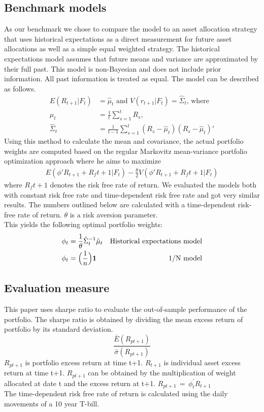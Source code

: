 \subsection{Benchmark models}
As our benchmark we chose to compare the model to an asset allocation strategy that uses historical expectations as a direct measurement for future asset allocations as well as a simple equal weighted strategy. The historical expectations model assumes that future means and variance are approximated by their full past. This model is non-Bayesian and does not include prior information. All past information is treated as equal. The model can be described as follows.
\begin{align*}
E(R_{t+1}|F_t) &= \hat{\mu}_t \text{ and } V(r_{t+1} |F_t ) = \hat{\Sigma}_t \text{, where}\\
\hat{\mu}_t &= \frac{1}{t}\sum_{s=1}^{t}R_s, \\
\hat{\Sigma}_t &= \frac{1}{t-1}\sum_{s=1}^{t}(R_s-\hat{\mu}_t)(R_s-\hat{\mu}_t)'
\end{align*}
Using this method to calculate the mean and covariance, the actual portfolio weights are computed based on the regular Markovitz mean-variance portfolio optimization approach where he aims to maximize 
\begin{align*}
E(\phi'R_{t+1} + R_ft+1 | F_t)-\frac{\theta}{2}V(\phi' R_{t+1} + R_ft+1 | F_t)
\end{align*}
where $R_ft+1$ denotes the risk free rate of return. We evaluated the models both with constant risk free rate and time-dependent risk free rate and got very similar results. The numbers outlined below are calculated with a time-dependent risk-free rate of return. $\theta$ is a risk aversion parameter. \\
This yields the following optimal portfolio weights:
\begin{align*}
\phi_t &= \frac{1}{\theta} \hat{\Sigma}_t^{-1}\hat{\mu}_t &\text{Historical expectations model}\\
\phi_t &= \Big(\frac{1}{n}\Big)\bf{1} &\text{1/N model}
\end{align*}

\subsection{Evaluation measure}
This paper uses sharpe ratio to evaluate the out-of-sample performance of the portfolio. The sharpe ratio is obtained by dividing the mean excess return of portfolio by its standard deviation. 
$$\frac{\bar{E}(R_{pt+1})}{\bar{\sigma}(R_{pt+1})}$$
$R_{pt+1}$ is portfolio excess return at time t+1. $R_{t+1}$ is individual asset excess return at time t+1. $R_{pt+1}$ can be obtained by the multiplication of weight allocated at date t and the excess return at t+1. $R_{pt+1}\,=\,\phi_{t}^{\prime}R_{t+1}$\\
The time-dependent risk free rate of return is calculated using the daily movements of a 10 year T-bill. 

